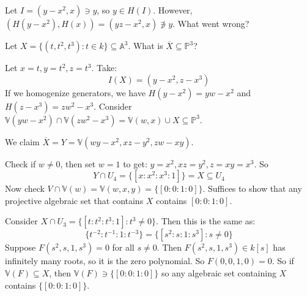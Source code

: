 \documentclass{report}
\begin{document}
\begin{examples}
    \begin{example}
        Let $I = (y - x^{2}, x) \ni y$, so $y \in H(I)$. However, $(H(y - x^{2}), H(x)) = (yz - x^{2}, x) \not\ni y$. What went wrong?
            \begin{fixedfigure}
            \end{fixedfigure}
    \end{example}
    \begin{example}
        Let $X = \{(t, t^{2}, t^{3}) : t \in k\} \subseteq \mathbb{A}^{3}$. What is $\overline{X} \subseteq \mathbb{P}^{3}$? 

        Let $x = t, y = t^{2}, z = t^{3}$. Take:
            \begin{equation*}
                I(X) = (y - x^{2}, z - x^{3})
            \end{equation*}
        If we homogenize generators, we have $H(y - x^{2}) = yw - x^{2}$ and $H(z - x^{3}) = zw^{2} - x^{3}$. Consider $\mathbb{V}(yw - x^{2}) \cap \mathbb{V}(zw^{2} - x^{3}) = \mathbb{V}(w, x) \cup X \subseteq \mathbb{P}^{3}$. 
            \begin{fixedfigure}
            \end{fixedfigure}
        We claim $\overline{X} = Y = \mathbb{V}(wy - x^{2}, xz - y^{2}, zw - xy)$.

        Check if $w \neq 0$, then set $w = 1$ to get: $y = x^{2}, xz = y^{2}, z = xy = x^{3}$. So
            \begin{equation*}
                Y \cap U_{4} = \{[x : x^{2} : x^{3} : 1]\} = X \subseteq U_{4}
            \end{equation*}
        Now check $V \cap \mathbb{V}(w) = \mathbb{V}(w, x, y) = \{[0 : 0 : 1 : 0]\}$. Suffices to show that any projective algebraic set that contains $X$ contains $[0: 0 : 1 : 0]$.

        Consider $X \cap U_{3} = \{[t : t^{2} : t^{3} : 1] : t^{3} \neq 0\}$. Then this is the same as:
            \begin{equation*}
                \{t^{-2}: t^{-1} : 1 : t^{-3}\} = \{[s^{2} : s : 1 : s^{3}] : s \neq 0\}
            \end{equation*}
        Suppose $F(s^{2}, s, 1, s^{3}) = 0$ for all $s \neq 0$. Then $F(s^{2}, s, 1, s^{3}) \in k[s]$ has infinitely many roots, so it is the zero polynomial. So $F(0, 0, 1, 0) = 0$. So if $\mathbb{V}(F) \subseteq X$, then $\mathbb{V}(F) \ni \{[0 : 0 : 1 : 0]\}$ so any algebraic set containing $X$ contains $\{[0 : 0 : 1 : 0]\}$.
    \end{example}
\end{examples}
\end{document}

